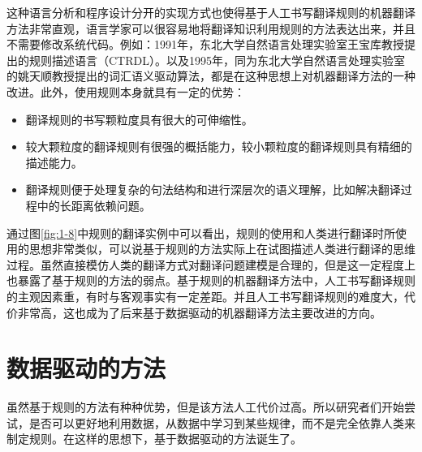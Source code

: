 \parinterval 这种语言分析和程序设计分开的实现方式也使得基于人工书写翻译规则的机器翻译方法非常直观，语言学家可以很容易地将翻译知识利用规则的方法表达出来，并且不需要修改系统代码。例如：1991年，东北大学自然语言处理实验室王宝库教授提出的规则描述语言（CTRDL）。以及1995年，同为东北大学自然语言处理实验室的姚天顺教授提出的词汇语义驱动算法，都是在这种思想上对机器翻译方法的一种改进。此外，使用规则本身就具有一定的优势：

\begin{itemize}
\vspace{0.5em}
\item 翻译规则的书写颗粒度具有很大的可伸缩性。
\vspace{0.5em}
\item 较大颗粒度的翻译规则有很强的概括能力，较小颗粒度的翻译规则具有精细的描述能力。
\vspace{0.5em}
\item 翻译规则便于处理复杂的句法结构和进行深层次的语义理解，比如解决翻译过程中的长距离依赖问题。
\vspace{0.5em}
\end{itemize}

\parinterval 通过图\ref{fig:1-8}中规则的翻译实例中可以看出，规则的使用和人类进行翻译时所使用的思想非常类似，可以说基于规则的方法实际上在试图描述人类进行翻译的思维过程。虽然直接模仿人类的翻译方式对翻译问题建模是合理的，但是这一定程度上也暴露了基于规则的方法的弱点。基于规则的机器翻译方法中，人工书写翻译规则的主观因素重，有时与客观事实有一定差距。并且人工书写翻译规则的难度大，代价非常高，这也成为了后来基于数据驱动的机器翻译方法主要改进的方向。


\sectionnewpage
\section{数据驱动的方法}
\parinterval 虽然基于规则的方法有种种优势，但是该方法人工代价过高。所以研究者们开始尝试，是否可以更好地利用数据，从数据中学习到某些规律，而不是完全依靠人类来制定规则。在这样的思想下，基于数据驱动的方法诞生了。


